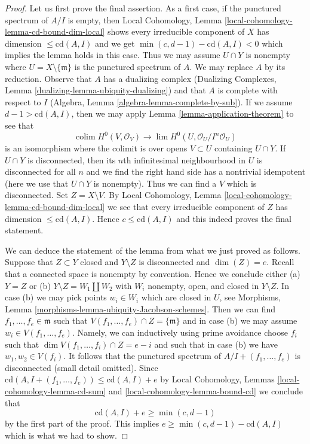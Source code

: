 \documentclass{stacks-project}
\theoremstyle{plain}
\theoremstyle{definition}
\theoremstyle{remark}
\numberwithin{equation}{subsection}
\def\lim{\mathop{\mathrm{lim}}\nolimits}
\def\colim{\mathop{\mathrm{colim}}\nolimits}
\begin{document}
\begin{proof}
Let us first prove the final assertion. As a first case, if the punctured
spectrum of $A/I$ is empty, then
Local Cohomology, Lemma \ref{local-cohomology-lemma-cd-bound-dim-local}
shows every irreducible component of $X$ has dimension
$\leq \text{cd}(A, I)$ and we get $\min(c, d - 1) - \text{cd}(A, I) < 0$
which implies the lemma holds in this case. Thus we may assume
$U \cap Y$ is nonempty where $U = X \setminus \{\mathfrak m\}$
is the punctured spectrum of $A$. We may replace $A$ by its reduction.
Observe that $A$ has a dualizing complex
(Dualizing Complexes, Lemma \ref{dualizing-lemma-ubiquity-dualizing})
and that $A$ is complete with respect to $I$
(Algebra, Lemma \ref{algebra-lemma-complete-by-sub}).
If we assume $d - 1 > \text{cd}(A, I)$, then we may apply
Lemma \ref{lemma-application-theorem} to see that
$$
\colim H^0(V, \mathcal{O}_V)
\longrightarrow
\lim H^0(U, \mathcal{O}_U/I^n\mathcal{O}_U)
$$
is an isomorphism where the colimit is over opens $V \subset U$
containing $U \cap Y$. If $U \cap Y$ is disconnected, then
its $n$th infinitesimal neighbourhood in $U$ is disconnected
for all $n$ and we find the
right hand side has a nontrivial idempotent (here we use
that $U \cap Y$ is nonempty).
Thus we can find a $V$ which is disconnected.
Set $Z = X \setminus V$. By
Local Cohomology, Lemma \ref{local-cohomology-lemma-cd-bound-dim-local}
we see that every irreducible component of $Z$ has dimension
$\leq \text{cd}(A, I)$. Hence $c \leq \text{cd}(A, I)$ and this
indeed proves the final statement.

\medskip\noindent
We can deduce the statement of the lemma from what we just proved
as follows. Suppose that $Z \subset Y$ closed and $Y \setminus Z$ is
disconnected and $\dim(Z) = e$. Recall that a connected space is nonempty
by convention. Hence we conclude either (a) $Y = Z$ or (b)
$Y \setminus Z = W_1 \amalg W_2$ with $W_i$ nonempty, open, and closed
in $Y \setminus Z$. In case (b) we may pick points $w_i \in W_i$
which are closed in $U$, see
Morphisms, Lemma \ref{morphisms-lemma-ubiquity-Jacobson-schemes}.
Then we can find $f_1, \ldots, f_e \in \mathfrak m$
such that $V(f_1, \ldots, f_e) \cap Z = \{\mathfrak m\}$
and in case (b) we may assume $w_i \in V(f_1, \ldots, f_e)$.
Namely, we can inductively using prime avoidance
choose $f_i$ such that $\dim V(f_1, \ldots, f_i) \cap Z = e - i$
and such that in case (b) we have $w_1, w_2 \in V(f_i)$.
It follows that the punctured spectrum of $A/I + (f_1, \ldots, f_e)$
is disconnected (small detail omitted). Since
$\text{cd}(A, I + (f_1, \ldots, f_e)) \leq \text{cd}(A, I) + e$ by
Local Cohomology, Lemmas \ref{local-cohomology-lemma-cd-sum} and
\ref{local-cohomology-lemma-bound-cd} we conclude that
$$
\text{cd}(A, I) + e \geq \min(c, d - 1)
$$
by the first part of the proof. This implies
$e \geq \min(c, d - 1) - \text{cd}(A, I)$ which is what we had to show.
\end{proof}
\end{document}
